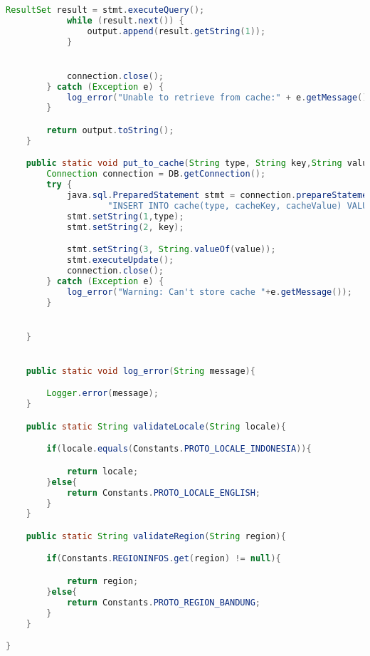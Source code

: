 \begin{lstlisting}[language=Java,basicstyle=\tiny,caption=Utils.java]
            ResultSet result = stmt.executeQuery();
            while (result.next()) {
                output.append(result.getString(1));
            }


            connection.close();
        } catch (Exception e) {
            log_error("Unable to retrieve from cache:" + e.getMessage());
        }

        return output.toString();
    }

    public static void put_to_cache(String type, String key,String value){
        Connection connection = DB.getConnection();
        try {
            java.sql.PreparedStatement stmt = connection.prepareStatement(
                    "INSERT INTO cache(type, cacheKey, cacheValue) VALUES (?,?,?)");
            stmt.setString(1,type);
            stmt.setString(2, key);

            stmt.setString(3, String.valueOf(value));
            stmt.executeUpdate();
            connection.close();
        } catch (Exception e) {
            log_error("Warning: Can't store cache "+e.getMessage());
        }


    }


    public static void log_error(String message){

        Logger.error(message);
    }

    public static String validateLocale(String locale){

        if(locale.equals(Constants.PROTO_LOCALE_INDONESIA)){

            return locale;
        }else{
            return Constants.PROTO_LOCALE_ENGLISH;
        }
    }

    public static String validateRegion(String region){

        if(Constants.REGIONINFOS.get(region) != null){

            return region;
        }else{
            return Constants.PROTO_REGION_BANDUNG;
        }
    }

}


\end{lstlisting}

